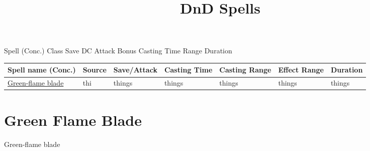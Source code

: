 \documentclass{article}
\title{DnD Spells}
\begin{document}
Spell (Conc.)
Class
Save DC
Attack Bonus
Casting Time
Range
Duration

\begin{tabular}{l|l|l|l|l|l|l}
     Spell name (Conc.) & Source & Save/Attack & Casting Time & Casting Range & Effect Range & Duration \\
     \hline
     \hyperref[sec:GreenFlameBlade]{Green-flame blade}& thi & things & things & things & things & things
\end{tabular}

\newpage
\twocolumn
\section{Green Flame Blade}
Green-flame blade\label{sec:GreenFlameBlade}
\end{document}
